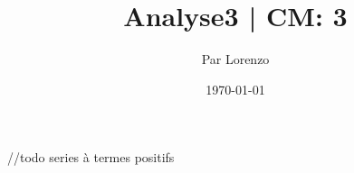 \documentclass[a4paper, 12pt]{article}
\title{Analyse3 | CM: 3}
\author{Par Lorenzo}
\date{\today}
\begin{document}
\maketitle

//todo series à termes positifs
\end{document}
